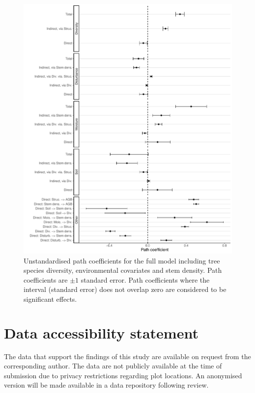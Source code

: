 \documentclass[11pt,a4paper]{article}
\begin{document}
\begin{figure}[H]
\centering
	\includegraphics[width=\textwidth]{full_model_slopes}
	\caption{Unstandardised path coefficients for the full model including tree species diversity, environmental covariates and stem density. Path coefficients are $\pm1$ standard error. Path coefficients where the interval (standard error) does not overlap zero are considered to be significant effects.}
	\label{full_model_slopes}
\end{figure}

\section{Data accessibility statement}

The data that support the findings of this study are available on request from the corresponding author. The data are not publicly available at the time of submission due to privacy restrictions regarding plot locations. An anonymised version will be made available in a data repository following review. 
\end{document}
